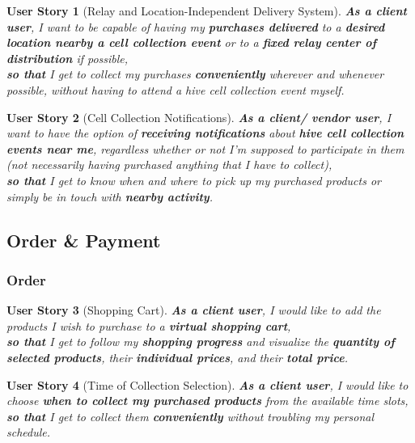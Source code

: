 \documentclass[a4paper,12pt]{book}
\theoremstyle{break}
\newtheorem{userStory}{User Story}
\theoremstyle{break}
\theoremstyle{definition}
\theoremstyle{remark}
\begin{document}
\begin{userStory}[Relay and Location-Independent Delivery System]
\textbf{As a {\color{green} client} user}, I want to be capable of having my \textbf{purchases delivered} to a \textbf{desired location nearby a cell collection event} or to a \textbf{fixed relay center of distribution} if possible,\\
\indent
\textbf{so that} I get to collect my purchases \textbf{conveniently} wherever and whenever possible, without having to attend a hive cell collection event myself.
\end{userStory}

\begin{userStory}[Cell Collection Notifications]
\textbf{As a {\color{green} client}/{\color{red} vendor} user}, I want to have the option of \textbf{receiving notifications} about \textbf{hive cell collection events near me}, regardless whether or not I'm supposed to participate in them (not necessarily having purchased anything that I have to collect),\\
\indent
\textbf{so that} I get to know when and where to pick up my purchased products or simply be in touch with \textbf{nearby activity}.
\end{userStory}

\subsection{Order \& Payment}
\subsubsection{Order}
\begin{userStory}[Shopping Cart]
\textbf{As a {\color{green} client} user}, I would like to add the products I wish to purchase to a \textbf{virtual shopping cart},\\
\indent
\textbf{so that} I get to follow my \textbf{shopping progress} and visualize the \textbf{quantity of selected products}, their \textbf{individual prices}, and their \textbf{total price}.
\end{userStory}

\begin{userStory}[Time of Collection Selection]
\textbf{As a {\color{green} client} user}, I would like to choose \textbf{when to collect my purchased products} from the available time slots,\\
\indent
\textbf{so that} I get to collect them \textbf{conveniently} without troubling my personal schedule.
\end{userStory}
\end{document}
